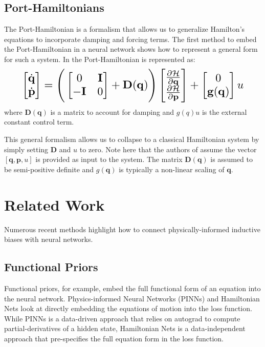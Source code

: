 \documentclass[twoside]{article}
\begin{document}
\subsection{Port-Hamiltonians}

The Port-Hamiltonian is a formalism that allows us to generalize Hamilton's equations to incorporate damping and forcing terms. The first method to embed the Port-Hamiltonian in a neural network \cite{zhong_dissipative_2020} shows how to represent a general form for such a system. In \cite{zhong_dissipative_2020} the Port-Hamiltonian is represented as:
\begin{equation}
\resizebox{0.9\linewidth}{!}{$%
\begin{bmatrix}
\dot{\mathbf{q}} \\
\dot{\mathbf{p}}
\end{bmatrix}
=
\Bigg(\begin{bmatrix}
0 & \mathbf{I} \\
-\mathbf{I} & 0
\end{bmatrix} +
\mathbf{D}(\mathbf{q})
 \Bigg)
 \begin{bmatrix}
\frac{\partial \mathcal{H}}{\partial \mathbf{q}} \\
\frac{\partial \mathcal{H}}{\partial \mathbf{p}}
\end{bmatrix}
+
\begin{bmatrix}
0 \\
\mathbf{g}(\mathbf{q})
\end{bmatrix}
u
$%
}%
\label{eqn.pham}
\end{equation}
where $\mathbf{D}(\mathbf{q})$ is a matrix to account for damping and $g(q)u$ is the external constant control term. 

This general formalism allows us to collapse to a classical Hamiltonian system by simply setting $\mathbf{D}$ and $u$ to zero. Note here that the authors of \cite{zhong_dissipative_2020} assume the vector $[\mathbf{q},\mathbf{p},u]$ is provided as input to the system. The matrix $\mathbf{D}(\mathbf{q})$ is assumed to be semi-positive definite and $g(\mathbf{q})$ is typically a non-linear scaling of $\mathbf{q}$.

\section{Related Work}

Numerous recent methods highlight how to connect physically-informed inductive biases with neural networks.

\subsection{Functional Priors}
Functional priors, for example, embed the full functional form of an equation into the neural network. Physics-informed Neural Networks (PINNs) \cite{raissi_physics_2017,raissi_physics-informed_2019} and Hamiltonian Nets \cite{mattheakis_hamiltonian_2020} look at directly embedding the equations of motion into the loss function. While PINNs is a data-driven approach that relies on autograd to compute partial-derivatives of a hidden state, Hamiltonian Nets is a data-independent approach that pre-specifies the full equation form in the loss function.
\end{document}

